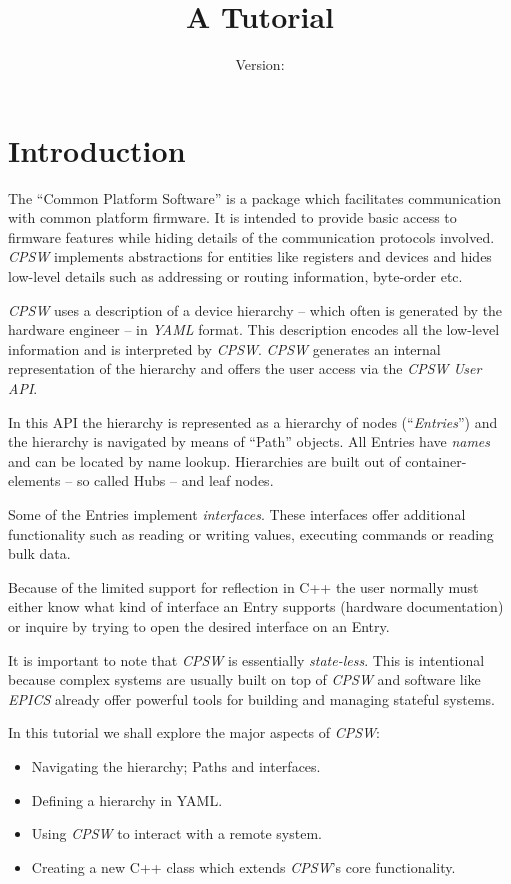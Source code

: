 \documentclass[10pt]{article}
\title{A \cpsw{} Tutorial}
\date{Version: }
\newcommand{\ita}[1]{\emph{#1}}
\newcommand{\cpsw}      {\ita {CPSW}}
\newcommand{\yaml}      {\ita {YAML}}
\newcommand{\entry}     {{Entry}}
\newcommand{\entries}   {{Entries}}
\newcommand{\hub}       {{Hub}}
\newcommand{\Path}      {{Path}}
\newcommand{\cpp}       {C++}
\begin{document}
\maketitle

\section{Introduction}
The ``Common Platform Software'' is a package which facilitates communication with
common platform firmware. It is intended to provide basic access to firmware features
while hiding details of the communication protocols involved. \cpsw{} implements
abstractions for entities like registers and devices and hides low-level details such
as addressing or routing information, byte-order etc.

\cpsw{} uses a description of a device hierarchy -- which often is generated by the
hardware engineer -- in \yaml{} format. This description encodes all the low-level
information and is interpreted by \cpsw{}. \cpsw{} generates an internal representation
of the hierarchy and offers the user access via the {\em \cpsw{} User API}.

In this API the hierarchy is represented as a hierarchy of nodes (``{\em \entries}'')
and the hierarchy is navigated by means of ``\Path{}'' objects. All \entries{} have
{\em names} and can be located by name lookup. Hierarchies are built out of container-
elements -- so called \hub{}s -- and leaf nodes.

Some of the \entries{} implement {\em interfaces}. These interfaces offer additional
functionality such as reading or writing values, executing commands or reading bulk data.

Because of the limited support for reflection in \cpp{} the user normally must either
know what kind of interface an \entry{} supports (hardware documentation) or inquire
by trying to open the desired interface on an \entry{}.

It is important to note that \cpsw{} is essentially {\em state-less}. This is intentional
because complex systems are usually built on top of \cpsw{} and software like {\em EPICS}
already offer powerful tools for building and managing stateful systems.

In this tutorial we shall explore the major aspects of \cpsw:
\begin{itemize}
  \item  Navigating the hierarchy; \Path{}s and interfaces.
  \item  Defining a hierarchy in YAML.
  \item  Using \cpsw{} to interact with a remote system.
  \item  Creating a new \cpp{} class which extends \cpsw{}'s core functionality.
\end{itemize}
\end{document}
